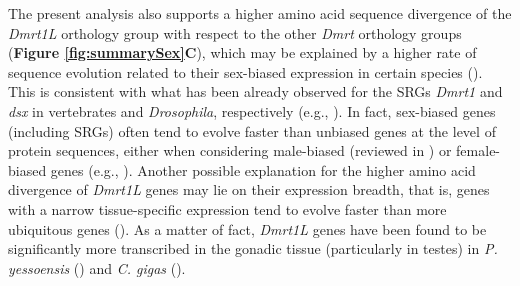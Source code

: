 \documentclass[../main.tex]{subfiles}
\begin{document}
The present analysis also supports a higher amino acid sequence divergence of the \textit{Dmrt1L} orthology group with respect to the other \textit{Dmrt} orthology groups (\textbf{Figure \ref{fig:summarySex}C}), which may be explained by a higher rate of sequence evolution related to their sex-biased expression in certain species (\textbf{\cite{zhang2014genomic,shi2015novo,li2018foxl2,evensen2022comparative}}). This is consistent with what has been already observed for the SRGs \textit{Dmrt1} and \textit{dsx} in vertebrates and \textit{Drosophila}, respectively (e.g., \textbf{\cite{bewick2011evolution,baral2019genetic}}). In fact, sex-biased genes (including SRGs) often tend to evolve faster than unbiased genes at the level of protein sequences, either when considering male-biased (reviewed in \textbf{\cite{parsch2013evolutionary,grath2016sex}}) or female-biased genes (e.g., \textbf{\cite{papa2017rapid,ghiselli2018comparative}}). Another possible explanation for the higher amino acid divergence of \textit{Dmrt1L} genes may lie on their expression breadth, that is, genes with a narrow tissue-specific expression tend to evolve faster than more ubiquitous genes (\textbf{\cite{parsch2013evolutionary,xu2022multi}}). As a matter of fact, \textit{Dmrt1L} genes have been found to be significantly more transcribed in the gonadic tissue (particularly in testes) in \textit{P. yessoensis} (\textbf{\cite{li2018foxl2}}) and \textit{C. gigas} (\textbf{\cite{yue2021variance}}).
\end{document}
